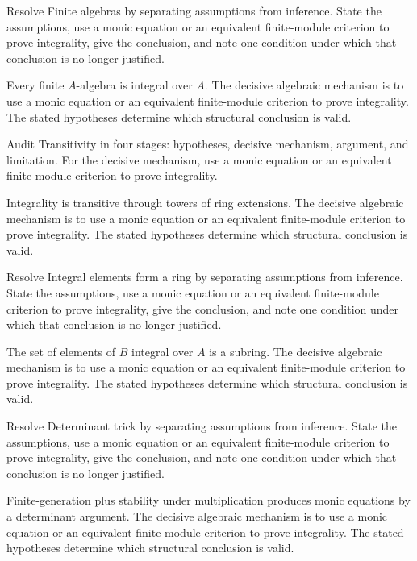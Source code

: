 \begin{problem}\label{prob:v19-problem-04}
Resolve Finite algebras by separating assumptions from inference. State the assumptions, use a monic equation or an equivalent finite-module criterion to prove integrality, give the conclusion, and note one condition under which that conclusion is no longer justified.
\end{problem}
\begin{solution}
Every finite $A$-algebra is integral over $A$. The decisive algebraic mechanism is to use a monic equation or an equivalent finite-module criterion to prove integrality. The stated hypotheses determine which structural conclusion is valid.
\end{solution}

\begin{problem}\label{prob:v19-problem-05}
Audit Transitivity in four stages: hypotheses, decisive mechanism, argument, and limitation. For the decisive mechanism, use a monic equation or an equivalent finite-module criterion to prove integrality.
\end{problem}
\begin{solution}
Integrality is transitive through towers of ring extensions. The decisive algebraic mechanism is to use a monic equation or an equivalent finite-module criterion to prove integrality. The stated hypotheses determine which structural conclusion is valid.
\end{solution}

\begin{problem}\label{prob:v19-problem-06}
Resolve Integral elements form a ring by separating assumptions from inference. State the assumptions, use a monic equation or an equivalent finite-module criterion to prove integrality, give the conclusion, and note one condition under which that conclusion is no longer justified.
\end{problem}
\begin{solution}
The set of elements of $B$ integral over $A$ is a subring. The decisive algebraic mechanism is to use a monic equation or an equivalent finite-module criterion to prove integrality. The stated hypotheses determine which structural conclusion is valid.
\end{solution}

\begin{problem}\label{prob:v19-problem-07}
Resolve Determinant trick by separating assumptions from inference. State the assumptions, use a monic equation or an equivalent finite-module criterion to prove integrality, give the conclusion, and note one condition under which that conclusion is no longer justified.
\end{problem}
\begin{solution}
Finite-generation plus stability under multiplication produces monic equations by a determinant argument. The decisive algebraic mechanism is to use a monic equation or an equivalent finite-module criterion to prove integrality. The stated hypotheses determine which structural conclusion is valid.
\end{solution}


